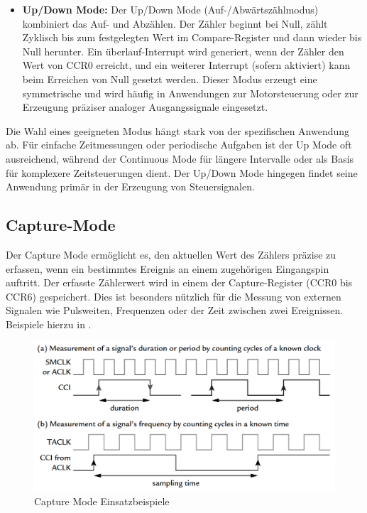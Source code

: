 \begin{itemize}
	\item \textbf{Up/Down Mode:} Der Up/Down Mode (Auf-/Abw\"artsz\"ahlmodus) kombiniert das Auf- und Abz\"ahlen. Der Z\"ahler beginnt bei Null, z\"ahlt Zyklisch bis zum festgelegten Wert im Compare-Register und dann wieder bis Null herunter. Ein \"uberlauf-Interrupt wird generiert, wenn der Z\"ahler den Wert von CCR0 erreicht, und ein weiterer Interrupt (sofern aktiviert) kann beim Erreichen von Null gesetzt werden.  Dieser Modus erzeugt eine symmetrische  und wird h\"aufig in Anwendungen zur Motorsteuerung oder zur Erzeugung pr\"aziser analoger Ausgangssignale eingesetzt. 
\end{itemize}

Die Wahl eines geeigneten Modus h\"angt stark von der spezifischen Anwendung ab. F\"ur einfache Zeitmessungen oder periodische Aufgaben ist der Up Mode oft ausreichend, w\"ahrend der Continuous Mode f\"ur l\"angere Intervalle oder als Basis f\"ur komplexere Zeitsteuerungen dient. Der Up/Down Mode hingegen findet seine Anwendung prim\"ar in der Erzeugung von Steuersignalen.

\subsection{Capture-Mode}
\label{Timer_CaptureMode}

Der Capture Mode erm\"oglicht es, den aktuellen Wert des Z\"ahlers pr\"azise zu erfassen, wenn ein bestimmtes Ereignis an einem zugeh\"origen Eingangspin auftritt. Der erfasste Z\"ahlerwert wird in einem der Capture-Register (CCR0 bis CCR6) gespeichert. Dies ist besonders n\"utzlich f\"ur die Messung von externen Signalen wie Pulsweiten, Frequenzen oder der Zeit zwischen zwei Ereignissen. Beispiele hierzu in .

\begin{figure}[h!]
	\centering
	\includegraphics[width=1.0\textwidth]{../Bilder/CaptureMode_Beispiele.png}
	\caption{Capture Mode Einsatzbeispiele\\}
	\label{fig:CaptureModeBeispiele}
\end{figure}


